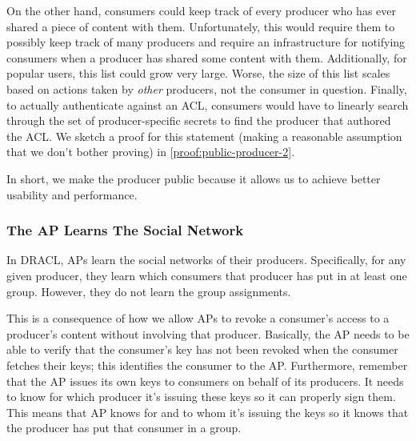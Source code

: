 \documentclass[pdftex,12pt,a4papaer,twoside,notitlepage]{report}
\begin{document}
On the other hand, consumers could keep track of every producer who has ever
shared a piece of content with them. Unfortunately, this would require them to
possibly keep track of many producers and require an infrastructure for
notifying consumers when a producer has shared some content with them.
Additionally, for popular users, this list could grow very large. Worse, the
size of this list scales based on actions taken by \emph{other} producers, not
the consumer in question. Finally, to actually authenticate against an ACL,
consumers would have to linearly search through the set of producer-specific
secrets to find the producer that authored the ACL\@. We sketch a proof for this
statement (making a reasonable assumption that we don't bother proving) in
\cref{proof:public-producer-2}.

In short, we make the producer public because it allows us to achieve better
usability and performance.

\subsubsection{The AP Learns The Social Network}
\label{sec:ap_learns_network}

In DRACL, APs learn the social networks of their producers. Specifically,
for any given producer, they learn which consumers that producer has put in at
least one group. However, they do not learn the group assignments.

This is a consequence of how we allow APs to revoke a consumer's access to a
producer's content without involving that producer. Basically, the AP needs to
be able to verify that the consumer's key has not been revoked when the consumer
fetches their keys; this identifies the consumer to the AP. Furthermore,
remember that the AP issues its own keys to consumers on behalf of its
producers. It needs to know for which producer it's issuing these keys so it can
properly sign them. This means that AP knows for and to whom it's issuing the
keys so it knows that the producer has put that consumer in a group.
\end{document}
